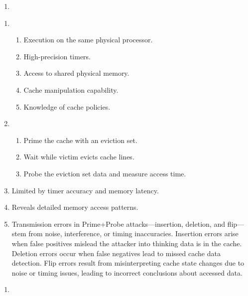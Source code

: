 \documentclass[sheet=2, prefix, english]{dexercise}
\begin{document}

\begin{enumerate}
  \item
\end{enumerate}


\begin{enumerate}
  \item
    \begin{enumerate}
      \item Execution on the same physical processor.
      \item High-precision timers.
      \item Access to shared physical memory.
      \item Cache manipulation capability.
      \item Knowledge of cache policies.
    \end{enumerate}
  \item
    \begin{enumerate}
      \item Prime the cache with an eviction set.
      \item Wait while victim evicts cache lines.
      \item Probe the eviction set data and measure access time.
    \end{enumerate}
  \item Limited by timer accuracy and memory latency.
  \item Reveals detailed memory access patterns.
  \item
    Transmission errors in Prime+Probe attacks—insertion, deletion, and
    flip—stem from noise, interference, or timing inaccuracies.
    Insertion errors arise when false positives mislead the attacker into
    thinking data is in the cache.
    Deletion errors occur when false negatives lead to missed cache data
    detection.
    Flip errors result from misinterpreting cache state changes due to noise or
    timing issues, leading to incorrect conclusions about accessed data.
\end{enumerate}


\begin{enumerate}
  \item
\end{enumerate}
\end{document}
